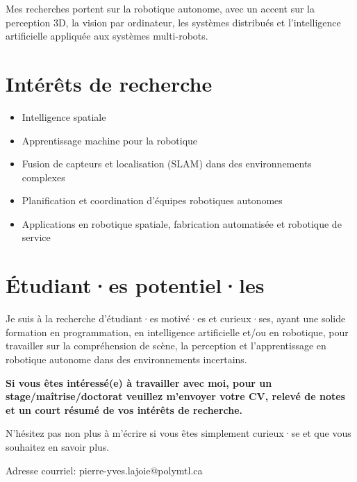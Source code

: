 \documentclass[a4paper,12pt]{article}
\begin{document}
Mes recherches portent sur la robotique autonome, avec un accent sur la perception 3D, la vision par ordinateur, les systèmes distribués et l'intelligence artificielle appliquée aux systèmes multi-robots.

\section{Intérêts de recherche}
\begin{itemize}[leftmargin=1em]
    \item Intelligence spatiale
    \item Apprentissage machine pour la robotique
    \item Fusion de capteurs et localisation (SLAM) dans des environnements complexes
    \item Planification et coordination d'équipes robotiques autonomes
    \item Applications en robotique spatiale, fabrication automatisée et robotique de service
\end{itemize}

\section{Étudiant·es potentiel·les}  
Je suis à la recherche d’étudiant·es motivé·es et curieux·ses, ayant une solide formation en programmation, en intelligence artificielle et/ou en robotique, pour travailler sur la compréhension de scène, la perception et l’apprentissage en robotique autonome dans des environnements incertains.


\vspace{2em}
\textbf{Si vous êtes intéressé(e) à travailler avec moi, pour un stage/maîtrise/doctorat veuillez m'envoyer votre CV, relevé de notes et un court résumé de vos intérêts de recherche.}

\vspace{1em}
\noindent N’hésitez pas non plus à m’écrire si vous êtes simplement curieux·se et que vous souhaitez en savoir plus.

\vspace{1em}
Adresse courriel: pierre-yves.lajoie@polymtl.ca
\end{document}
